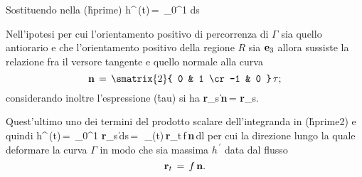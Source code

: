 Sostituendo nella (\r{hprime}) 
\be
h^{\,\prime}(t)\,=
         \,\ds\int_0^1\,\,ds
\ee

Nell'ipotesi per cui l'orientamento positivo di percorrenza di $\Gamma$ sia quello antiorario
e che l'orientamento positivo della regione $R$ sia ${\bf e}_3$ allora sussiste la relazione
fra il versore tangente e quello normale alla curva 
$$
{\bf n}\,=\,\smatrix{2}{  0 & 1 \cr
                         -1 & 0 }\,{\bf \tau};
$$
considerando inoltre l'espressione (\r{tau}) si ha
\be
\|{\bf r}_s\|\,{\bf n}\,=\,\,{\bf r}_s.
\ee 

Quest'ultimo \e uno dei termini del prodotto scalare dell'integranda in (\r{hprime2}) e 
quindi
\be
h^{\,\prime}(t)\,=
         \,\ds\int_0^1\,\,\|{\bf r}_s\|\,ds\,=\,
         \,\ds\int_{\Gamma(t)}\,{\bf r}_t\cdot\,f\,{\bf n}\,dl
\ee
per cui la direzione lungo la quale deformare la curva $\Gamma$ in modo che sia massima
$h^{\,\prime}$ \e data dal flusso 
$$
{\bf r}_t\,=\,f\,{\bf n}.
$$


\finepar